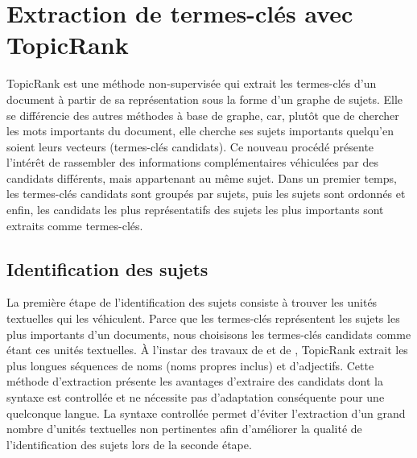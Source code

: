 \section{Extraction de termes-clés avec TopicRank}
\label{sec:extraction_de_termes_cles_avec_topicrank}
  TopicRank est une méthode non-supervisée qui extrait les termes-clés d'un
  document à partir de sa représentation sous la forme d'un graphe de sujets.
  Elle se différencie des autres méthodes à base de graphe, car, plutôt que de
  chercher les mots importants du document, elle cherche ses sujets importants
  quelqu'en soient leurs vecteurs (termes-clés candidats). Ce nouveau procédé
  présente l'intérêt de rassembler des informations complémentaires véhiculées
  par des candidats différents, mais appartenant au même sujet.
  Dans un premier temps, les termes-clés candidats sont groupés par sujets, puis
  les sujets sont ordonnés et enfin, les candidats les plus représentatifs des
  sujets les plus importants sont extraits comme termes-clés.

  \subsection{Identification des sujets}
  \label{subsec:identification_des_sujets}
    La première étape de l'identification des sujets consiste à trouver les
    unités textuelles qui les véhiculent. Parce que les termes-clés représentent
    les sujets les plus importants d'un documents, nous choisisons les
    termes-clés candidats comme étant ces unités textuelles.
    À l'instar des travaux de  et de
    , TopicRank extrait les plus longues séquences
    de noms (noms propres inclus) et d'adjectifs. Cette méthode d'extraction
    présente les avantages d'extraire des candidats dont la syntaxe est
    controllée et ne nécessite pas d'adaptation conséquente pour une quelconque
    langue. La syntaxe controllée permet d'éviter l'extraction d'un grand nombre
    d'unités textuelles non pertinentes afin d'améliorer la qualité de
    l'identification des sujets lors de la seconde étape.

